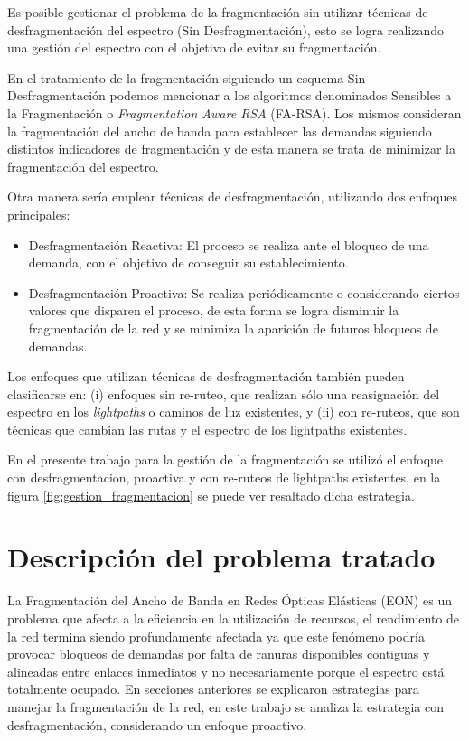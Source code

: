 Es posible gestionar el problema de la fragmentación sin utilizar técnicas de desfragmentación del espectro (Sin Desfragmentación), esto se logra realizando una gestión del espectro con el objetivo de evitar su fragmentación.

En el tratamiento de la fragmentación siguiendo un esquema Sin Desfragmentación podemos mencionar a los algoritmos denominados Sensibles a la Fragmentación o \textit{Fragmentation Aware RSA} (FA-RSA). Los mismos consideran la fragmentación del ancho de banda para establecer las demandas siguiendo distintos indicadores de fragmentación y de esta manera se trata de minimizar la fragmentación del espectro.

Otra manera sería emplear técnicas de desfragmentación, utilizando dos enfoques principales:
\begin{itemize}
         \item Desfragmentación Reactiva: El proceso se realiza ante el bloqueo de una demanda, con el objetivo de conseguir su establecimiento.
         \item Desfragmentación Proactiva: Se realiza periódicamente o considerando ciertos valores que disparen el proceso, de esta forma se logra disminuir la fragmentación de la red y se minimiza la aparición de futuros bloqueos de demandas.
\end{itemize}
Los enfoques que utilizan técnicas de desfragmentación también pueden clasificarse en: (i) enfoques sin re-ruteo, que realizan sólo una reasignación del espectro en los \textit{lightpaths} o caminos de luz existentes, y (ii) con re-ruteos, que son técnicas que cambian las rutas y el espectro de los lightpaths existentes.

En el presente trabajo para la gestión de la fragmentación se utilizó el enfoque con desfragmentacion, proactiva y con re-ruteos de lightpaths existentes, en la figura \ref{fig:gestion_fragmentacion} se puede ver resaltado dicha estrategia.

\section{Descripción del problema tratado}
La Fragmentación del Ancho de Banda en Redes Ópticas Elásticas (EON) es un problema que afecta a la eficiencia en la utilización de recursos, el rendimiento de la red termina siendo profundamente afectada ya que este fenómeno podría provocar bloqueos de demandas por falta de ranuras disponibles contiguas y alineadas entre enlaces inmediatos y no necesariamente porque el espectro está totalmente ocupado. En secciones anteriores se explicaron estrategias para manejar la fragmentación de la red, en este trabajo se analiza la estrategia con desfragmentación, considerando un enfoque proactivo.

